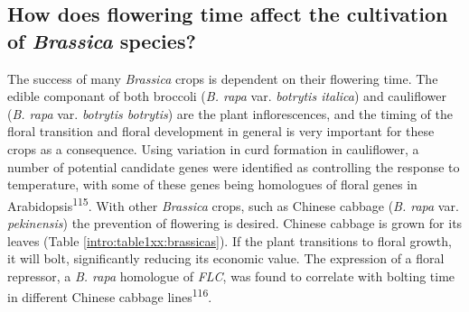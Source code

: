 \documentclass[12pt,]{book}
\begin{document}
\subsection{\texorpdfstring{How does flowering time affect the
cultivation of \emph{Brassica}
species?}{How does flowering time affect the cultivation of Brassica species?}}\label{how-does-flowering-time-affect-the-cultivation-of-brassica-species}

The success of many \emph{Brassica} crops is dependent on their
flowering time. The edible componant of both broccoli (\emph{B. rapa}
var. \emph{botrytis italica}) and cauliflower (\emph{B. rapa} var.
\emph{botrytis botrytis}) are the plant inflorescences, and the timing
of the floral transition and floral development in general is very
important for these crops as a consequence. Using variation in curd
formation in cauliflower, a number of potential candidate genes were
identified as controlling the response to temperature, with some of
these genes being homologues of floral genes in
Arabidopsis\textsuperscript{115}. With other \emph{Brassica} crops, such
as Chinese cabbage (\emph{B. rapa} var. \emph{pekinensis}) the
prevention of flowering is desired. Chinese cabbage is grown for its
leaves (Table \ref{intro:table1xx:brassicas}). If the plant transitions
to floral growth, it will bolt, significantly reducing its economic
value. The expression of a floral repressor, a \emph{B. rapa} homologue
of \emph{FLC}, was found to correlate with bolting time in different
Chinese cabbage lines\textsuperscript{116}.
\end{document}
